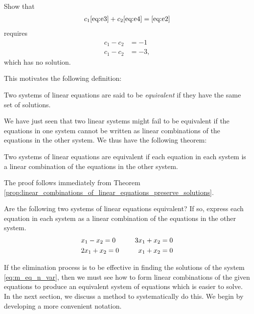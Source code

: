 \documentclass[12pt,letterpaper,reqno]{article}
\numberwithin{equation}{section}
\begin{document}
\begin{exercise}
Show that 
\begin{align*}
	c_1 \eqref{eq:e3} + c_2 \eqref{eq:e4} = \eqref{eq:e2}
\end{align*}
requires 
\begin{align*}
	c_1-c_2&=-1 \\
	c_1-c_2&=-3,
\end{align*}	
which has no solution.
\end{exercise}

This motivates the following definition:

\begin{defn} \label{def: equivalent_linear_systems}
	Two systems of linear equations are said to be \emph{equivalent} if they have the same set of solutions.
\end{defn}

We have just seen that two linear systems might fail to be equivalent if the equations in one system cannot be written as linear combinations of the equations in the other system. We thus have the following theorem:

\begin{thm}\label{prop:equivalent_linear_systems}
	Two systems of linear equations are equivalent if each equation in each system is a linear combination of the equations in the other system. 
\end{thm}

\begin{pf}
	The proof follows immediately from Theorem \ref{prop:linear_combinations_of_linear_equations_preserve_solutions}.
\end{pf}

\begin{exercise}
Are the following two systems of linear equations equivalent? If so, express each equation in each system as a linear combination of the equations in the other system.
\begin{align*}
	 x_1-x_2=0 \hspace{1.0cm} 3x_1+x_2&=0 \\
	2x_1+x_2=0 \hspace{1.0cm} x_1+x_2&=0
\end{align*}	
\end{exercise}

If the elimination process is to be effective in finding the solutions of the system \eqref{eq:m_eq_n_var}, then we must see how to form linear combinations of the given equations to produce an equivalent system of equations which is easier to solve. In the next section, we discuss a method to systematically do this. We begin by developing a more convenient notation.
\end{document}
